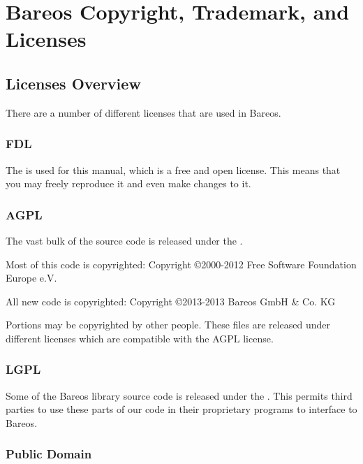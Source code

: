 \chapter{Bareos Copyright, Trademark, and Licenses}
\label{LicenseChapter}

\section{Licenses Overview}

There are a number of different licenses that are used in Bareos.

\subsection*{FDL}

The  is used for this manual,
which is a free and open license. This means that you may freely
reproduce it and even make changes to it.


\subsection*{AGPL}

The vast bulk of the source code is released under the
.

Most of this code is copyrighted: Copyright \copyright 2000-2012
Free Software Foundation Europe e.V.

All new code is copyrighted: Copyright \copyright 2013-2013 Bareos GmbH \& Co. KG

Portions may be copyrighted by other people.  These files are released
under different licenses which are compatible with the AGPL license.

\subsection*{LGPL}

Some of the Bareos library source code is released under the
. This
permits third parties to use these parts of our code in their proprietary
programs to interface to Bareos.

\subsection*{Public Domain}

